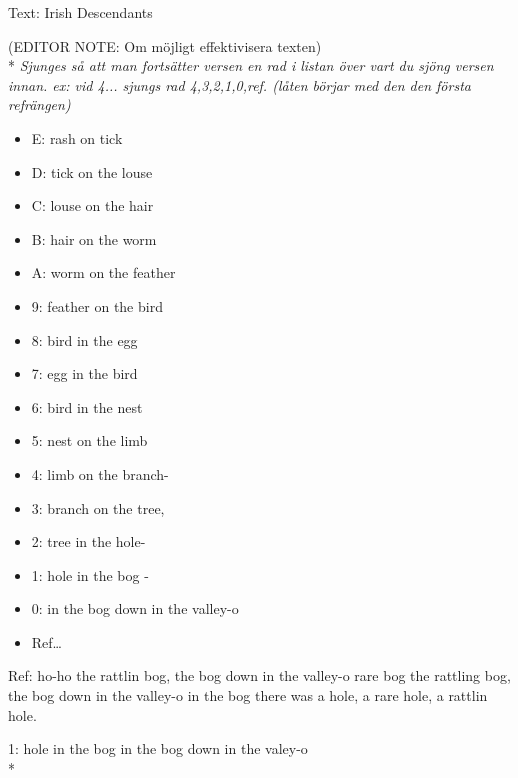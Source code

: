 \begin{SongText}
    \begin{SongInfo}
        Text: Irish Descendants
    \end{SongInfo}
    \begin{SongVerse}
        (EDITOR NOTE: Om möjligt effektivisera texten)\\*%
        \emph{Sjunges så att man fortsätter versen en rad i listan över vart
            du sjöng versen innan. ex: vid 4... sjungs rad 4,3,2,1,0,ref.
            (låten börjar med den den första refrängen)}
        \begin{itemize}
            \item E: rash on tick
            \item D: tick on the louse
            \item C: louse on the hair
            \item B: hair on the worm
            \item A: worm on the feather
            \item 9: feather on the bird
            \item 8: bird in the egg
            \item 7: egg in the bird
            \item 6: bird in the nest
            \item 5: nest on the limb
            \item 4: limb on the branch-
            \item 3: branch on the tree,
            \item 2: tree in the hole-
            \item 1: hole in the bog -
            \item 0: in the bog down in the valley-o
            \item Ref…
        \end{itemize}
        Ref:
        ho-ho the rattlin bog, the bog down in the valley-o
        rare bog the rattling bog, the bog down in the valley-o
        in the bog there was a hole, a rare hole, a rattlin hole.
    \end{SongVerse}
    \begin{SongVerse}
        1:
        hole in the bog in the bog down in the valey-o\\*%

\end{SongVerse}
\end{SongText}
